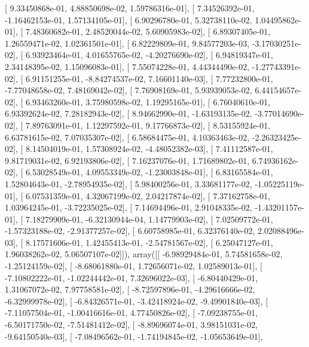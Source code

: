 \documentclass{article}
\begin{document}
       [  9.33450868e-01,   4.88850698e-02,   1.59786316e-01],
       [  7.34526392e-01,  -1.16462153e-01,   1.57134105e-01],
       [  6.90296780e-01,   5.32738110e-02,   1.04495862e-01],
       [  7.48360682e-01,   2.48520044e-02,   5.60905983e-02],
       [  6.89307405e-01,   1.26559471e-02,   1.02361501e-01],
       [  6.82229809e-01,   9.84577203e-03,  -3.17030251e-02],
       [  6.93923464e-01,   4.01655765e-02,  -4.20276690e-02],
       [  6.94819347e-01,   2.34148395e-02,   1.15096083e-01],
       [  7.55074228e-01,   4.44344490e-02,  -1.27743391e-02],
       [  6.91151255e-01,  -8.84274537e-02,   7.16601140e-03],
       [  7.77232800e-01,  -7.77048658e-02,   7.48169042e-02],
       [  7.76908169e-01,   5.93939053e-02,   6.44154657e-02],
       [  6.93463260e-01,   3.75980598e-02,   1.19295165e-01],
       [  6.76040610e-01,   6.93392624e-02,   7.28182943e-02],
       [  8.94662990e-01,  -1.63193135e-02,  -3.77014690e-02],
       [  7.89763091e-01,   1.12297592e-01,   9.17766873e-02],
       [  8.53155924e-01,   6.63781615e-02,   7.07035307e-02],
       [  6.58684475e-01,   4.10363463e-02,  -2.26323425e-02],
       [  8.14504019e-01,   1.57308924e-02,  -4.48052382e-03],
       [  7.41112587e-01,   9.81719031e-02,   6.92193806e-02],
       [  7.16237076e-01,   1.71689802e-01,   6.74936162e-02],
       [  6.53028549e-01,   4.09553349e-02,  -1.23003848e-01],
       [  6.83165584e-01,   1.52804643e-01,  -2.78954935e-02],
       [  5.98400256e-01,   3.33681177e-02,  -1.05225119e-01],
       [  6.07531359e-01,   4.32067199e-02,   2.04217874e-02],
       [  7.37162758e-01,   1.03964245e-01,  -3.72235025e-02],
       [  7.14694496e-01,   2.91048335e-02,  -1.43201157e-01],
       [  7.18279909e-01,  -6.32130944e-04,   1.14779903e-02],
       [  7.02509772e-01,  -1.57323188e-02,  -2.91377257e-02],
       [  6.60758985e-01,   6.32376140e-02,   2.02088496e-03],
       [  8.17571606e-01,   1.42455413e-01,  -2.54781567e-02],
       [  6.25047127e-01,   1.96038262e-02,   5.06507107e-02]]), array([[ -6.98929484e-01,   5.74581658e-02,  -1.25124159e-02],
       [ -8.68061880e-01,   1.72656071e-02,   1.02589013e-01],
       [ -7.10802222e-01,  -1.02244442e-01,   7.32696022e-03],
       [ -6.80440429e-01,   1.31067072e-02,   7.97758581e-02],
       [ -8.72597896e-01,  -4.29616666e-02,  -6.32999978e-02],
       [ -6.84326571e-01,  -3.42418924e-02,  -9.49901840e-03],
       [ -7.11057504e-01,  -1.00416616e-01,   4.77450826e-02],
       [ -7.09238755e-01,  -6.50171750e-02,  -7.51481412e-02],
       [ -8.89696074e-01,   3.98151031e-02,  -9.64150540e-03],
       [ -7.08496562e-01,  -1.74194845e-02,  -1.05653649e-01],
\end{document}
